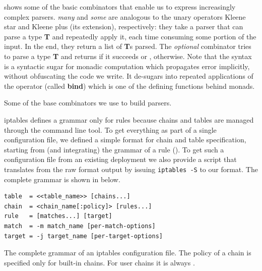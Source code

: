  shows some of the basic combinators
that enable us to express increasingly complex parsers.  \emph{many} and
\emph{some} are analogous to the unary operators Kleene star and Kleene plus
(its extension), respectively: they take a parser that can parse a type
\textbf{T} and repeatedly apply it, each time consuming some portion of the
input.  In the end, they return a list of \textbf{T}s parsed.  The
\emph{optional} combinator tries to parse a type \textbf{T} and returns
 if it succeeds or , otherwise.  Note that the
 syntax is a syntactic sugar for monadic computation which
propagates error implicitly, without obfuscating the code we write.  It
de-sugars into repeated applications of the \hlmath{$>>=$} operator (called
\textbf{bind}) which is one of the defining functions behind monads.

\begin{listing}[H]
  \caption{Some of the base combinators we use to build parsers.}
  \label{lst:combinators}
\end{listing}

iptables defines a grammar only for rules because chains and tables are managed
through the command line tool.  To get everything as part of a single
configuration file, we defined a simple format for chain and table
specification, starting from (and integrating) the grammar of a rule
().  To get such a configuration file
from an existing deployment we also provide a script that translates from the
raw format output by issuing \texttt{iptables -S} to our format.  The complete
grammar is shown in  below.

\begin{listing}
  \small
  \lstset{numbers=none, frame=single, basicstyle=\ttfamily,
    xleftmargin=0.15\textwidth, xrightmargin=0.15\textwidth
  }
  \begin{lstlisting}
table  = <<table_name>> [chains...]
chain  = <chain_name[:policy]> [rules...]
rule   = [matches...] [target]
match  = -m match_name [per-match-options]
target = -j target_name [per-target-options]
  \end{lstlisting}
  \caption{The complete grammar of an iptables configuration file.  The policy
  of a chain is specified only for built-in chains.  For user chains it is
  always \RETURN.}
  \label{lst:our-grammar}
\end{listing}

